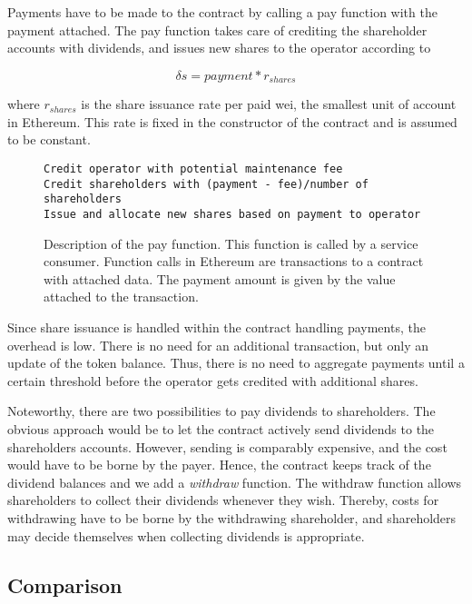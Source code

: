 Payments have to be made to the contract by calling a pay function with the payment attached. The pay function takes care of crediting the shareholder accounts with dividends, and issues new shares to the operator according to

\begin{equation*}
\delta s = payment * r_{shares} 
\end{equation*}

where $r_{shares}$ is the share issuance rate per paid wei, the smallest unit of account in Ethereum. This rate is fixed in the constructor of the contract and is assumed to be constant.

\begin{figure}
\label{lst:payfunction}
\begin{lstlisting}[breaklines]
Credit operator with potential maintenance fee
Credit shareholders with (payment - fee)/number of shareholders
Issue and allocate new shares based on payment to operator
\end{lstlisting}
\caption{Description of the pay function. This function is called by a service consumer. Function calls in Ethereum are transactions to a contract with attached data. The payment amount is given by the value attached to the transaction.}
\end{figure}

Since share issuance is handled within the contract handling payments, the overhead is low. There is no need for an additional transaction, but only an update of the token balance. Thus, there is no need to aggregate payments until a certain threshold before the operator gets credited with additional shares. 

Noteworthy, there are two possibilities to pay dividends to shareholders. The obvious approach would be to let the contract actively send dividends to the shareholders accounts. However, sending is comparably expensive, and the cost would have to be borne by the payer. Hence, the contract keeps track of the dividend balances and we add a \emph{withdraw} function. The withdraw function allows shareholders to collect their dividends whenever they wish. Thereby, costs for withdrawing have to be borne by the withdrawing shareholder, and shareholders may decide themselves when collecting dividends is appropriate. 

\subsection{Comparison}

